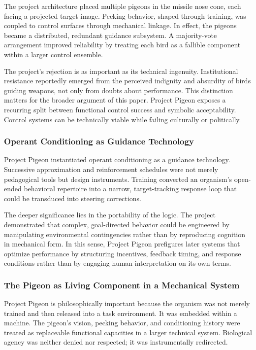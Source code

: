 \documentclass[11pt, a4paper]{article}
\begin{document}
The project architecture placed multiple pigeons in the missile nose cone, each facing a projected target image. Pecking behavior, shaped through training, was coupled to control surfaces through mechanical linkage. In effect, the pigeons became a distributed, redundant guidance subsystem. A majority-vote arrangement improved reliability by treating each bird as a fallible component within a larger control ensemble.

The project's rejection is as important as its technical ingenuity. Institutional resistance reportedly emerged from the perceived indignity and absurdity of birds guiding weapons, not only from doubts about performance. This distinction matters for the broader argument of this paper. Project Pigeon exposes a recurring split between functional control success and symbolic acceptability. Control systems can be technically viable while failing culturally or politically.

\subsubsection{Operant Conditioning as Guidance Technology}
Project Pigeon instantiated operant conditioning as a guidance technology. Successive approximation and reinforcement schedules were not merely pedagogical tools but design instruments. Training converted an organism's open-ended behavioral repertoire into a narrow, target-tracking response loop that could be transduced into steering corrections.

The deeper significance lies in the portability of the logic. The project demonstrated that complex, goal-directed behavior could be engineered by manipulating environmental contingencies rather than by reproducing cognition in mechanical form. In this sense, Project Pigeon prefigures later systems that optimize performance by structuring incentives, feedback timing, and response conditions rather than by engaging human interpretation on its own terms.

\subsubsection{The Pigeon as Living Component in a Mechanical System}
Project Pigeon is philosophically important because the organism was not merely trained and then released into a task environment. It was embedded within a machine. The pigeon's vision, pecking behavior, and conditioning history were treated as replaceable functional capacities in a larger technical system. Biological agency was neither denied nor respected; it was instrumentally redirected.
\end{document}
